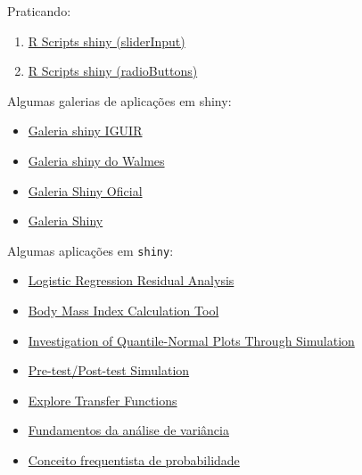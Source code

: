 \begin{frame}
 Praticando:
  \begin{enumerate}
  \item \href{run:./R/shiny/shiny}{R Scripts shiny (sliderInput)}
  \item \href{run:./R/shiny/shiny2}{R Scripts shiny (radioButtons)}
  \end{enumerate}

  \vspace{0.5cm}
  Algumas galerias de aplicações em shiny:

  \begin{itemize}
  \item \href{http://200.17.213.89:3838/iguir/list/}{Galeria shiny
      IGUIR}
  \item \href{http://200.17.213.89:3838/walmes/list/}{Galeria shiny do
      Walmes}
  \item \href{http://shiny.rstudio.com/gallery/}{Galeria Shiny Oficial}
  \item \href{http://www.showmeshiny.com/}{Galeria Shiny}
  \end{itemize}
  
\end{frame}

\begin{frame}
  Algumas aplicações em \texttt{shiny}:
  \begin{itemize}
  \item \href{http://www.stat.cmu.edu:3838/hseltman/LogReg/}{Logistic
      Regression Residual Analysis}
  \item \href{https://ilame.shinyapps.io/Test3}{Body Mass Index
      Calculation Tool}
  \item
    \href{https://hseltman.shinyapps.io/QuantileNormal}{Investigation of
      Quantile-Normal Plots Through Simulation}
  \item
    \href{http://www.stat.cmu.edu:3838/hseltman/PrePost/}{Pre-test/Post-test
      Simulation}
  \item
    \href{http://www.stat.cmu.edu:3838/hseltman/TransferFunctions/}{Explore
      Transfer Functions}
  \item
    \href{http://nbcgib.uesc.br/lec/avale-es/amb-virtual/inferencia/anava}{Fundamentos
      da análise de variância}
  \item
    \href{http://nbcgib.uesc.br/lec/avale-es/amb-virtual/probabilidade/con-frequentista}{Conceito
      frequentista de probabilidade}
  \end{itemize}

\end{frame}
